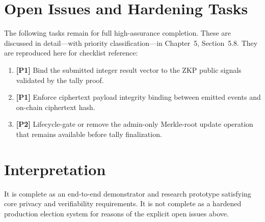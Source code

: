 \section{Open Issues and Hardening Tasks}
The following tasks remain for full high-assurance completion. These are discussed in detail---with priority classification---in Chapter~5, Section~5.8. They are reproduced here for checklist reference:
\begin{enumerate}
    \item \textbf{[P1]} Bind the submitted integer result vector to the ZKP public signals validated by the tally proof.
    \item \textbf{[P1]} Enforce ciphertext payload integrity binding between emitted events and on-chain ciphertext hash.
    \item \textbf{[P2]} Lifecycle-gate or remove the admin-only Merkle-root update operation that remains available before tally finalization.
\end{enumerate}

\section{Interpretation}
It is complete as an end-to-end demonstrator and research prototype satisfying core privacy and verifiability requirements. It is not complete as a hardened production election system for reasons of the explicit open issues above.

\endgroup

